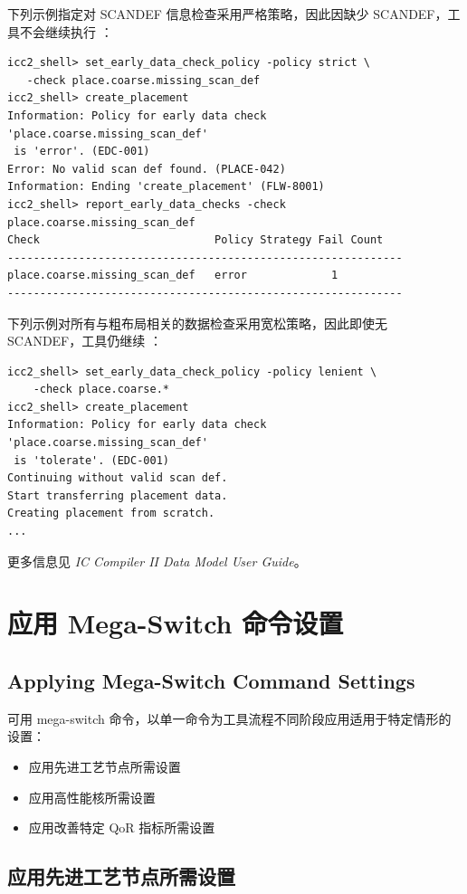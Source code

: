 下列示例指定对 SCANDEF 信息检查采用严格策略，因此因缺少 SCANDEF，工具不会继续执行 ：
\begin{lstlisting}
icc2_shell> set_early_data_check_policy -policy strict \
   -check place.coarse.missing_scan_def
icc2_shell> create_placement
Information: Policy for early data check 'place.coarse.missing_scan_def'
 is 'error'. (EDC-001)
Error: No valid scan def found. (PLACE-042)
Information: Ending 'create_placement' (FLW-8001)
icc2_shell> report_early_data_checks -check place.coarse.missing_scan_def
Check                           Policy Strategy Fail Count
-------------------------------------------------------------
place.coarse.missing_scan_def   error             1
-------------------------------------------------------------
\end{lstlisting}

下列示例对所有与粗布局相关的数据检查采用宽松策略，因此即使无 SCANDEF，工具仍继续 ：
\begin{lstlisting}
icc2_shell> set_early_data_check_policy -policy lenient \
    -check place.coarse.*
icc2_shell> create_placement
Information: Policy for early data check 'place.coarse.missing_scan_def'
 is 'tolerate'. (EDC-001)
Continuing without valid scan def.
Start transferring placement data.
Creating placement from scratch.
...
\end{lstlisting}

更多信息见 \textit{IC Compiler II Data Model User Guide}。

\section{应用 Mega-Switch 命令设置}
\subsection*{Applying Mega-Switch Command Settings}

可用 mega-switch 命令，以单一命令为工具流程不同阶段应用适用于特定情形的设置：
\begin{itemize}
  \item 应用先进工艺节点所需设置
  \item 应用高性能核所需设置
  \item 应用改善特定 QoR 指标所需设置
\end{itemize}

\subsection{应用先进工艺节点所需设置}
